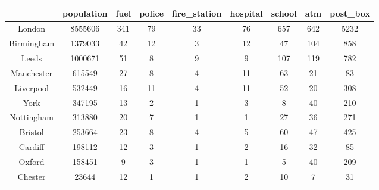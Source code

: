 \begin{tabular}{c|cccccccc}
& population & fuel & police & fire_station & hospital & school & atm & post_box \\
\hline
London & 8555606 & 341 & 79 & 33 & 76 & 657 & 642 & 5232 \\
Birmingham & 1379033 & 42 & 12 & 3 & 12 & 47 & 104 & 858 \\
Leeds & 1000671 & 51 & 8 & 9 & 9 & 107 & 119 & 782 \\
Manchester & 615549 & 27 & 8 & 4 & 11 & 63 & 21 & 83 \\
Liverpool & 532449 & 16 & 11 & 4 & 11 & 52 & 20 & 308 \\
York & 347195 & 13 & 2 & 1 & 3 & 8 & 40 & 210 \\
Nottingham & 313880 & 20 & 7 & 1 & 1 & 27 & 36 & 271 \\
Bristol & 253664 & 23 & 8 & 4 & 5 & 60 & 47 & 425 \\
Cardiff & 198112 & 12 & 3 & 1 & 2 & 16 & 32 & 85 \\
Oxford & 158451 & 9 & 3 & 1 & 1 & 5 & 40 & 209 \\
Chester & 23644 & 12 & 1 & 1 & 2 & 10 & 7 & 31 \\
\end{tabular}
